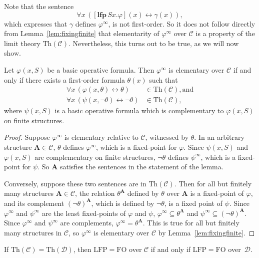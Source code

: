 \documentclass{lmcs}
\newcommand{\Th}{\mathrm{Th}}
\newcommand{\LFP}{\mathrm{LFP}}
\newcommand{\FO}{\mathrm{FO}}
\newcommand{\A}{\mathbf{A}}
\theoremstyle{thmC}
\begin{document}
Note that the sentence \[\forall x\,( [\mathbf{lfp}\,Sx.\varphi](x) \leftrightarrow \gamma(x)),\] which expresses that $\gamma$ defines $\varphi^\infty$, is not first-order. So it does not follow directly from Lemma~\ref{lem:fixingfinite} that elementarity of $\varphi^\infty$ over $\mathcal{C}$ is a property of the limit theory $\Th(\mathcal{C})$. Nevertheless, this turns out to be true, as we will now show. 

\begin{lem}\label{lem:Steve's-1}
Let $\varphi(x,S)$ be a basic operative formula. Then $\varphi^\infty$ is elementary over $\mathcal{C}$ if and only if there exists a first-order formula $\theta(x)$ such that
\begin{align*}
\forall x\, (\varphi(x,\theta)\leftrightarrow \theta)&\in \Th(\mathcal{C}), \text{and}\\
 \forall x\,( \psi(x,\neg \theta) \leftrightarrow \neg \theta) &\in \Th(\mathcal{C}),
\end{align*}
where $\psi(x,S)$ is a basic operative formula which is complementary to $\varphi(x,S)$ on finite structures.
\end{lem}

\begin{proof}
Suppose $\varphi^\infty$ is elementary relative to $\mathcal{C}$, witnessed by $\theta$. In an arbitrary structure $\A\in \mathcal{C}$, $\theta$ defines $\varphi^\infty$, which is a fixed-point for $\varphi$. Since $\psi(x,S)$ and $\varphi(x,S)$ are complementary on finite structures, $\neg \theta$ defines $\psi^\infty$, which is a fixed-point for $\psi$. So $\A$ satisfies the sentences in the statement of the lemma. 

Conversely, suppose these two sentences are in $\Th(\mathcal{C})$. Then for all but finitely many structures $\A\in \mathcal{C}$, the relation $\theta^\A$ defined by $\theta$ over $\A$ is a fixed-point of $\varphi$, and its complement $(\lnot\theta)^\A$, which is defined by $\lnot \theta$, is a fixed point of $\psi$. Since $\varphi^\infty$ and $\psi^\infty$ are the least fixed-points of $\varphi$ and $\psi$, $\varphi^\infty \subseteq \theta^\A$ and $\psi^\infty \subseteq (\neg \theta)^\A$. Since $\varphi^\infty$ and $\psi^\infty$ are complements, $\varphi^\infty = \theta^\A$. This is true for all but finitely many structures in $\mathcal{C}$, so $\varphi^\infty$ is elementary over $\mathcal{C}$ by Lemma~\ref{lem:fixingfinite}.
\end{proof}

\begin{cor}\label{cor:Steve's-1-cor}
If $\Th(\mathcal{C}) = \Th(\mathcal{D})$, then $\LFP=\FO$ over $\mathcal{C}$ if and only if $\LFP=\FO$ over~$\mathcal{D}$.
\end{cor}
\end{document}
